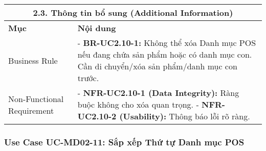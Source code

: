 \begin{longtable}{|m{4cm}|p{11cm}|}
\hline
\multicolumn{2}{|c|}{\textbf{2.3. Thông tin bổ sung (Additional Information)}} \\
\hline
\textbf{Mục} & \textbf{Nội dung} \\
\hline
Business Rule & - \textbf{BR-UC2.10-1:} Không thể xóa Danh mục POS nếu đang chứa sản phẩm hoặc có danh mục con. Cần di chuyển/xóa sản phẩm/danh mục con trước. \\
\hline
Non-Functional Requirement & - \textbf{NFR-UC2.10-1 (Data Integrity):} Ràng buộc không cho xóa quan trọng. \newline - \textbf{NFR-UC2.10-2 (Usability):} Thông báo lỗi rõ ràng. \\
\hline
\end{longtable}

\subsubsection{Use Case UC-MD02-11: Sắp xếp Thứ tự Danh mục POS}

